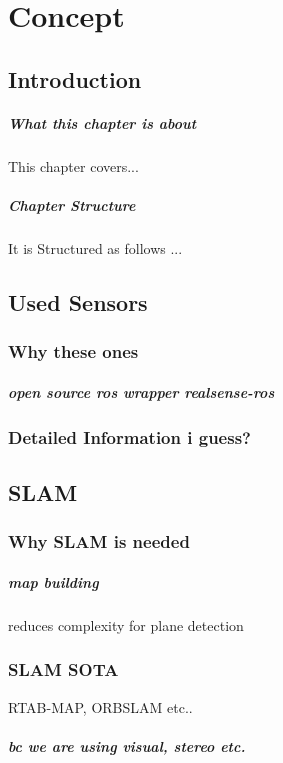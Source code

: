 \documentclass[main.tex]{subfiles}
\begin{document}
\chapter{Concept} \label{chap:Concept}

\section{Introduction}
\paragraph*{What this chapter is about}
This chapter covers...
\paragraph*{Chapter Structure}
It is Structured as follows ...

\section{Used Sensors}
\subsection*{Why these ones}
\paragraph*{open source ros wrapper realsense-ros}
\subsection*{Detailed Information i guess?}

\section{SLAM}
\subsection*{Why SLAM is needed}
\paragraph*{map building}
reduces complexity for plane detection
\subsection*{SLAM SOTA}
RTAB-MAP, ORBSLAM etc..
\paragraph*{bc we are using visual, stereo etc.}
\end{document}
